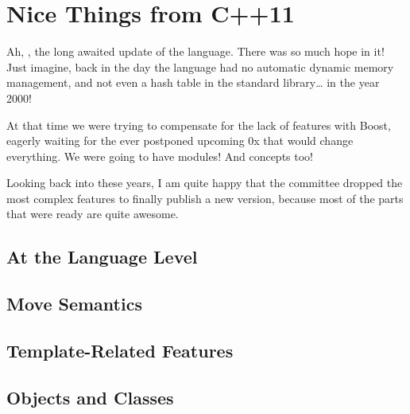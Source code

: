\chapter{Nice Things from C++11}

Ah, , the long awaited update of the language. There was so much
hope in it! Just imagine, back in the day the language had no
automatic dynamic memory management, and not even a hash table in the
standard library… in the year 2000!

At that time we were trying to compensate for the lack of features
with Boost, eagerly waiting for the ever postponed upcoming \cpp 0x
that would change everything. We were going to have modules! And
concepts too!

Looking back into these years, I am quite happy that the committee
dropped the most complex features to finally publish a new version,
because most of the parts that were ready are quite awesome.

\section{At the Language Level}













\section{Move Semantics}


\section{Template-Related Features}




\section{Objects and Classes}






